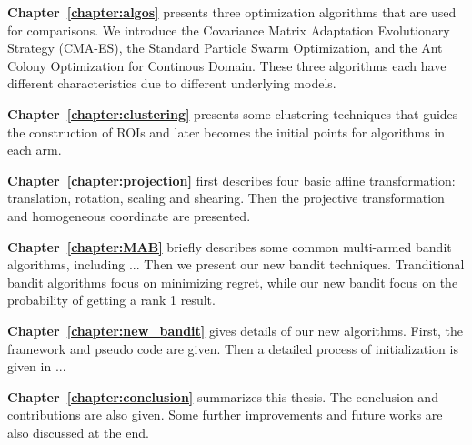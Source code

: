 \textbf{Chapter~\ref{chapter:algos}} presents three optimization algorithms that are used for comparisons.
We introduce 
the Covariance Matrix Adaptation Evolutionary Strategy (CMA-ES),
the Standard Particle Swarm Optimization, and
the Ant Colony Optimization for Continous Domain.
These three algorithms each have different characteristics due to different underlying models.


\textbf{Chapter~\ref{chapter:clustering}} presents some clustering techniques that guides the construction of ROIs and later becomes the initial points for algorithms in each arm.  

\textbf{Chapter~\ref{chapter:projection}} first describes four basic affine transformation: translation, rotation, scaling and shearing.
Then the projective transformation and homogeneous coordinate are presented.


\textbf{Chapter~\ref{chapter:MAB}} briefly describes some common multi-armed bandit algorithms, including ...
Then we present our new bandit techniques.
Tranditional bandit algorithms focus on minimizing regret, while our new bandit focus on the probability of getting a rank 1 result.


\textbf{Chapter~\ref{chapter:new_bandit}} gives details of our new algorithms.
First, the framework and pseudo code are given.
Then a detailed process of initialization is given in ...

\textbf{Chapter~\ref{chapter:conclusion}} summarizes this thesis. 
The conclusion and contributions are also given.
Some further improvements and future works are also discussed at the end.


